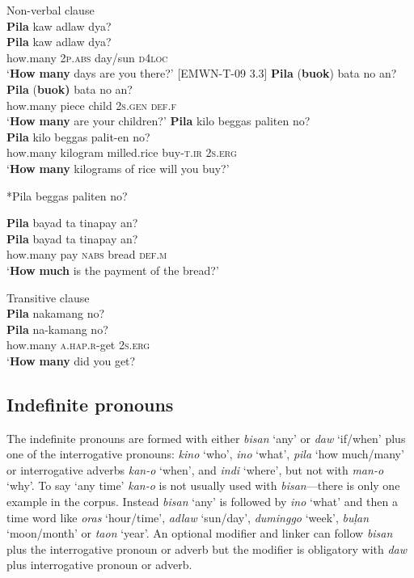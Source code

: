\ea
Non-verbal clause \\
\textbf{Pila}  kaw  adlaw  dya? \\\smallskip
 \gll \textbf{Pila}  kaw  adlaw  dya? \\
how.many  2\textsc{p.abs}  day/sun  \textsc{d}4\textsc{loc} \\
\glt ‘\textbf{How} \textbf{many} days are you there?' [EMWN-T-09 3.3]
\z
\ea
\textbf{Pila}  (\textbf{buok})  bata  no  an? \\\smallskip
 \gll \textbf{Pila}  (\textbf{buok)}  bata  no  an? \\
how.many  piece  child 2\textsc{s.gen}  \textsc{def.f} \\
\glt ‘\textbf{How} \textbf{many} are your children?’
\z
\ea
\textbf{Pila}  kilo  beggas  paliten  no? \\\smallskip
 \gll \textbf{Pila}  kilo  beggas  palit-en  no? \\
how.many  kilogram  milled.rice  buy-\textsc{t.ir}  2\textsc{s.erg} \\
\glt `\textbf{How} \textbf{many} kilograms of rice will you buy?' \\\smallskip

*Pila beggas paliten no?
\z

\ea
\textbf{Pila}  bayad  ta  tinapay  an? \\\smallskip
 \gll \textbf{Pila}  bayad  ta  tinapay  an? \\
how.many  pay  \textsc{nabs}  bread  \textsc{def.m} \\
\glt `\textbf{How} \textbf{much} is the payment of the bread?’
\z

\ea
Transitive clause \\
\textbf{Pila}  nakamang  no? \\\smallskip
 \gll \textbf{Pila}  na-kamang  no? \\
how.many  \textsc{a.hap.r}-get  2\textsc{s.erg} \\
\glt `\textbf{How} \textbf{many} did you get?
\z

\subsection{Indefinite pronouns}
\label{sec:indefinitepronouns}
The indefinite pronouns are formed with either \textit{bisan} ‘any’ or \textit{daw} ‘if/when’ plus one of the interrogative pronouns: \textit{kino} ‘who’, \textit{ino} ‘what’, \textit{pila} ‘how much/many’ or interrogative adverbs \textit{kan-o} ‘when’, and \textit{indi} ‘where’, but not with \textit{man-o} ‘why’. To say ‘any time’ \textit{kan-o} is not usually used with \textit{bisan}---there is only one example in the corpus.  Instead \textit{bisan} ‘any’ is followed by \textit{ino} ‘what’ and then a time word like \textit{oras} ‘hour/time’, \textit{adlaw} ‘sun/day’, \textit{duminggo} ‘week’, \textit{buļan} ‘moon/month’ or \textit{taon} ‘year’. An optional modifier and linker can follow \textit{bisan} plus the interrogative pronoun or adverb but the modifier is obligatory with \textit{daw} plus interrogative pronoun or adverb.

